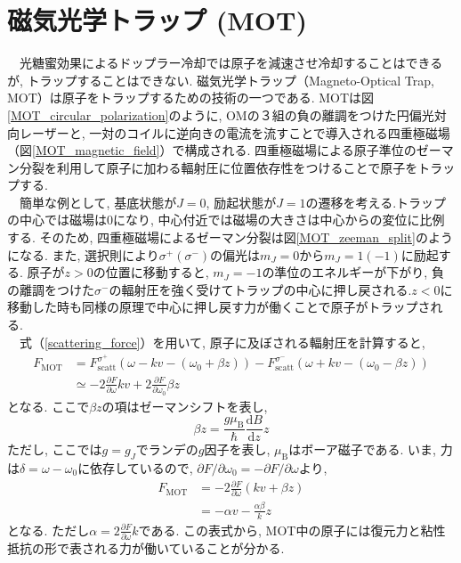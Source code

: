 \documentclass[uplatex, dvipdfmx, a4paper, report, papersize, 11pt]{jsbook}
\begin{document}
\section{磁気光学トラップ (MOT)}
　光糖蜜効果によるドップラー冷却では原子を減速させ冷却することはできるが, トラップすることはできない. 磁気光学トラップ（Magneto-Optical Trap,  MOT）は原子をトラップするための技術の一つである. MOTは図\ref{MOT_circular_polarization}のように, OMの３組の負の離調をつけた円偏光対向レーザーと, 一対のコイルに逆向きの電流を流すことで導入される四重極磁場（図\ref{MOT_magnetic_field}）で構成される. 四重極磁場による原子準位のゼーマン分裂を利用して原子に加わる輻射圧に位置依存性をつけることで原子をトラップする.\\
　簡単な例として, 基底状態が$J = 0$, 励起状態が$J = 1$の遷移を考える.トラップの中心では磁場は$0$になり, 中心付近では磁場の大きさは中心からの変位に比例する. そのため, 四重極磁場によるゼーマン分裂は図\ref{MOT_zeeman_split}のようになる. また, 選択則により$\sigma^{+}(\sigma^{-})$の偏光は$m_J = 0$から$m_J = 1 (-1)$に励起する. 原子が$z > 0$の位置に移動すると, $m_J = -1$の準位のエネルギーが下がり, 負の離調をつけた$\sigma^-$の輻射圧を強く受けてトラップの中心に押し戻される.$z < 0$に移動した時も同様の原理で中心に押し戻す力が働くことで原子がトラップされる.\\
 　式（\ref{scattering_force}）を用いて, 原子に及ぼされる輻射圧を計算すると,
\begin{equation}
  \begin{aligned}
     F _ { \mathrm { MOT } } & = F _ { \mathrm { scatt } } ^ { \sigma ^ { + } } \left( \omega - k v - \left( \omega _ { 0 } + \beta z \right) \right) - F _ { \mathrm { scatt } } ^ { \sigma ^ { - } } \left( \omega + k v - \left( \omega _ { 0 } - \beta z \right) \right) \\ & \simeq - 2 \frac { \partial F } { \partial \omega } k v + 2 \frac { \partial F } { \partial \omega _ { 0 } } \beta z
  \end{aligned}
\end{equation}
となる. ここで$\beta z$の項はゼーマンシフトを表し,
\begin{equation}
  \beta z = \frac { g \mu _ { \mathrm { B } } } { \hbar } \frac { \mathrm { d } B } { \mathrm { d } z } z
\end{equation}
ただし, ここでは$g = g _ { J }$でランデの$g$因子を表し, $\mu _ { \mathrm { B }}$はボーア磁子である. いま, 力は$\delta = \omega - \omega _ { 0 }$に依存しているので, $\partial F / \partial \omega _ { 0 } = - \partial F / \partial \omega$より,
\begin{equation}
  \begin{aligned} F _ { \mathrm { MOT } } & = - 2 \frac { \partial F } { \partial \omega } ( k v + \beta z ) \\ & = - \alpha v - \frac { \alpha \beta } { k } z \end{aligned}
\end{equation}
となる. ただし$\alpha = 2\frac{\partial F}{\partial \omega} k$である. この表式から, MOT中の原子には復元力と粘性抵抗の形で表される力が働いていることが分かる.
\newpage
\end{document}
